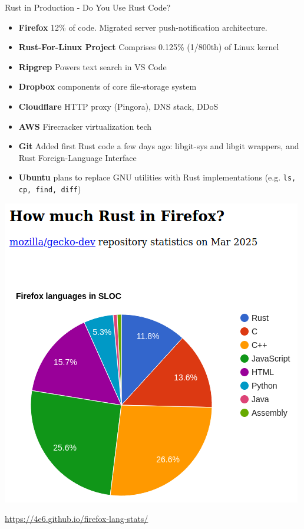 \documentclass{beamer}
\begin{document}
\begin{frame}{Rust in Production - Do You Use Rust Code?} 
\begin{block}{}

\begin{itemize} 
	\item<2-> \textbf{Firefox} 
	12\% of code. Migrated server push-notification architecture.
	\item<3-> \textbf{Rust-For-Linux Project} 
	Comprises 0.125\% (1/800th) of Linux kernel
	\item<4-> \textbf{Ripgrep} 
	Powers text search in VS Code
	\item<5-> \textbf{Dropbox}
	components of core file-storage system
	\item<6-> \textbf{Cloudflare}
	HTTP proxy (Pingora), DNS stack, DDoS 
	\item<7-> \textbf{AWS}
	Firecracker virtualization tech
	\item<8-> \textbf{Git} Added first Rust code a few days ago: 
	libgit-sys and libgit wrappers, and Rust Foreign-Language Interface
	\item<9-> \textbf{Ubuntu} plans to replace GNU utilities with Rust implementations
	(e.g. \texttt{ls, cp, find, diff})
\end{itemize} 
\end{block}
\end{frame}  


\begin{frame}{} 
\begin{center}
\includegraphics[scale=0.45]{rust-in-firefox}
\end{center}
\url{https://4e6.github.io/firefox-lang-stats/}
\end{frame} 
\end{document}
